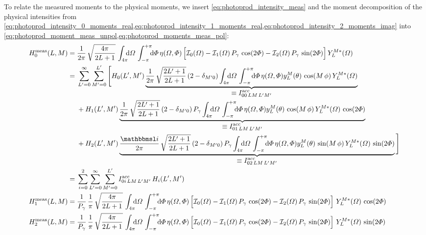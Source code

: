 To relate the measured moments to the physical moments, we insert
\cref{eq:photoprod_intensity_meas} and the moment decomposition of the
physical intensities from
\cref{eq:photoprod_intensity_0_moments_real,eq:photoprod_intensity_1_moments_real,eq:photoprod_intensity_2_moments_imag}
into
\cref{eq:photoprod_moment_meas_unpol,eq:photoprod_moments_meas_pol}:
\begin{align}
  H_0^\text{meas}(L, M)
  ={}& \frac{1}{2 \pi}\, \sqrt{\frac{4 \pi}{2 L + 1}}\, \int_{4 \pi}\!\!\! \dif{\Omega}\, \int_{-\pi}^{+\pi}\!\!\! \dif{\Phi}\,
  \eta(\Omega, \Phi) \sBrk[2]{\mathcal{I}_0(\Omega)
  - \mathcal{I}_1(\Omega)\, P_\gamma\, \cos(2 \Phi)
  - \mathcal{I}_2(\Omega)\, P_\gamma\, \sin(2 \Phi)}
  Y_L^{M *}(\Omega) \notag
  \\
  ={}& \sum_{L' = 0}^\infty \sum_{M' = 0}^{L'} \Bigg[
  H_0(L', M')\,
  \dUnderbrace{\frac{1}{2 \pi}\, \sqrt{\frac{2 L' + 1}{2 L + 1}}\, (2 - \delta_{M' 0})
  \int_{4 \pi}\!\!\! \dif{\Omega}\, \int_{-\pi}^{+\pi}\!\!\! \dif{\Phi}\,
  \eta(\Omega, \Phi) y_L^M(\theta)\, \cos(M\, \phi)\,
  Y_L^{M *}(\Omega)}{\equiv I^\text{acc}_{0 0\, L M\, L' M'}} \notag
  \\
  & + H_1(L', M')\,
  \dUnderbrace{\frac{1}{2 \pi}\, \sqrt{\frac{2 L' + 1}{2 L + 1}}\, (2 - \delta_{M' 0})\, P_\gamma
  \int_{4 \pi}\!\!\! \dif{\Omega}\, \int_{-\pi}^{+\pi}\!\!\! \dif{\Phi}\,
  \eta(\Omega, \Phi) y_L^M(\theta)\, \cos(M\, \phi)\,
  Y_L^{M *}(\Omega)\,
  \cos(2 \Phi)}{\equiv I^\text{acc}_{0 1\, L M\, L' M'}} \notag
  \\
  & + H_2(L', M')\,
  \dUnderbrace{\frac{\imag}{2 \pi}\, \sqrt{\frac{2 L' + 1}{2 L + 1}}\, (2 - \delta_{M' 0})\, P_\gamma
  \int_{4 \pi}\!\!\! \dif{\Omega}\, \int_{-\pi}^{+\pi}\!\!\! \dif{\Phi}\,
  \eta(\Omega, \Phi) y_L^M(\theta)\, \sin(M\, \phi)\,
  Y_L^{M *}(\Omega)\,
  \sin(2 \Phi)}{\equiv I^\text{acc}_{0 2\, L M\, L' M'}}\,
  \Bigg] \notag
  \\
  ={}& \sum_{i = 0}^2 \sum_{L' = 0}^\infty \sum_{M' = 0}^{L'}
  I^\text{acc}_{0 i\, L M\, L' M'}\, H_i(L', M')
  \\
  H_1^\text{meas}(L, M)
  ={}& \frac{1}{P_\gamma}\, \frac{1}{\pi}\, \sqrt{\frac{4 \pi}{2 L + 1}}\, \int_{4 \pi}\!\!\! \dif{\Omega}\, \int_{-\pi}^{+\pi}\!\!\! \dif{\Phi}\,
  \eta(\Omega, \Phi) \sBrk[2]{\mathcal{I}_0(\Omega)
  - \mathcal{I}_1(\Omega)\, P_\gamma\, \cos(2 \Phi)
  - \mathcal{I}_2(\Omega)\, P_\gamma\, \sin(2 \Phi)}\,
  Y_L^{M *}(\Omega)\, \cos(2 \Phi) \notag
  \\
  H_2^\text{meas}(L, M)
  ={}& \frac{1}{P_\gamma}\, \frac{1}{\pi}\, \sqrt{\frac{4 \pi}{2 L + 1}}\, \int_{4 \pi}\!\!\! \dif{\Omega}\, \int_{-\pi}^{+\pi}\!\!\! \dif{\Phi}\,
  \eta(\Omega, \Phi) \sBrk[2]{\mathcal{I}_0(\Omega)
  - \mathcal{I}_1(\Omega)\, P_\gamma\, \cos(2 \Phi)
  - \mathcal{I}_2(\Omega)\, P_\gamma\, \sin(2 \Phi)}\,
  Y_L^{M *}(\Omega)\, \sin(2 \Phi) \notag
\end{align}



